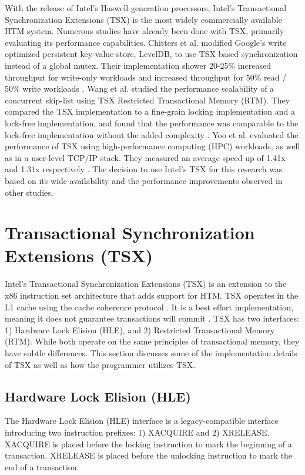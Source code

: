 \documentclass[11pt]{book}
\begin{document}
With the release of Intel's Haswell generation processors, Intel's Transactional
Synchronization Extensions (TSX) is the most widely commercially available HTM system.
Numerous studies have already been done with TSX, primarily evaluating its performance
capabilities.  Chitters et al. modified Google's write optimized persistent key-value
store, LevelDB, to use TSX based synchronization instead of a global mutex.  Their
implementation shower 20-25\% increased throughput for write-only workloads and increased
throughput for 50\% read / 50\% write workloads \cite{chitters_tsx}.  Wang et al. studied
the performance scalability of a concurrent skip-list using TSX Restricted Transactional
Memory (RTM).  They compared the TSX implementation to a fine-grain locking implementation
and a lock-free implementation, and found that the performance was comparable to the
lock-free implementation without the added complexity \cite{wang_tsx}.  Yoo et
al. evaluated the performance of TSX using high-performance computing (HPC) workloads, as
well as in a user-level TCP/IP stack.  They measured an average speed up of 1.41x and
1.31x respectively \cite{yoo_tsx}.  The decision to use Intel's TSX for this research was
based on its wide availability and the performance improvements observed in other studies.

\section{Transactional Synchronization Extensions (TSX)}

Intel's Transactional Synchronization Extensions (TSX) is an extension to the x86
instruction set architecture that adds support for HTM.  TSX operates in the L1 cache
using the cache coherence protocol \cite{intel_opt_man}.  It is a best effort
implementation, meaning it does not guarantee transactions will commit
\cite{intel_prog_ref}.  TSX has two interfaces: 1) Hardware Lock Elision (HLE), and 2)
Restricted Transactional Memory (RTM).  While both operate on the same principles of
transactional memory, they have subtle differences.  This section discusses some of the
implementation details of TSX as well as how the programmer utilizes TSX.

\subsection{Hardware Lock Elision (HLE)}\label{sec:hle}

The Hardware Lock Elision (HLE) interface is a legacy-compatible interface introducing two
instruction prefixes: 1) XACQUIRE and 2) XRELEASE.  XACQUIRE is placed before the locking
instruction to mark the beginning of a transaction.  XRELEASE is placed before the
unlocking instruction to mark the end of a transaction.
\end{document}

